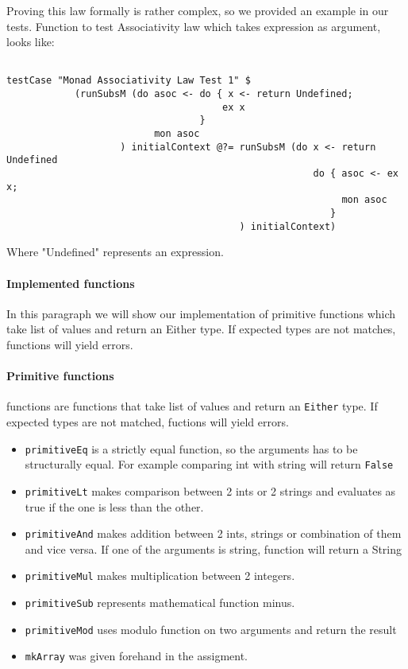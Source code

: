 \documentclass[11pt]{article}
\begin{document}
Proving this law formally is rather complex, so we provided an example in our tests. Function to test Associativity law which takes expression as argument, looks like:
\begin{verbatim}

testCase "Monad Associativity Law Test 1" $
            (runSubsM (do asoc <- do { x <- return Undefined;
                                      ex x
                                  }
                          mon asoc
                    ) initialContext @?= runSubsM (do x <- return Undefined
                                                      do { asoc <- ex x;
                                                           mon asoc
                                                         }
                                         ) initialContext) 
\end{verbatim}

Where "Undefined" represents an expression.

\paragraph{Implemented functions}

In this paragraph we will show our implementation of primitive functions which take list of values and return an Either type.
If expected types are not matches, functions will yield errors.

\paragraph{Primitive functions}
functions are functions that take list of values and return an \texttt{Either} type. If expected types are not matched, fuctions will yield errors. 
\begin{itemize}
\item \texttt{primitiveEq} is a strictly equal function, so the arguments has to be structurally equal. For example comparing int with string will return \texttt{False}
\item \texttt{primitiveLt} makes comparison between 2 ints or 2 strings and evaluates as true if the one is less than the other.
\item \texttt{primitiveAnd} makes addition between 2 ints, strings or combination of them and vice versa. If one of the arguments is string, function will return a String 
\item \texttt{primitiveMul} makes multiplication between 2 integers. 
\item \texttt{primitiveSub} represents mathematical function minus.
\item \texttt{primitiveMod} uses modulo function on two arguments and return the result
\item \texttt{mkArray} was given forehand in the assigment.
\end{itemize}
\end{document}
